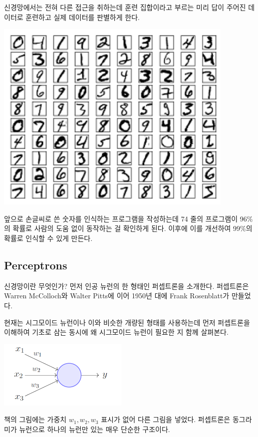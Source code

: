 \documentclass[ %
    a4paper,    %
    amsmath,    %
    itemph,     %
]{oblivoir}     %
\begin{document}
신경망에서는 전혀 다른 접근을 취하는데 훈련 집합이라고 부르는 미리 
답이 주어진 데이터로 훈련하고 실제 데이터를 판별하게 한다. 

\includegraphics[scale=0.5]{image/2_training_set}

앞으로 손글씨로 쓴 숫자를 인식하는 프로그램을 작성하는데 74 줄의 프로그램이 
96\%의 확률로 사람의 도움 없이 동작하는 걸 확인하게 된다. 이후에 
이를 개선하여 99\%의 확률로 인식할 수 있게 만든다. 

\subsection{Perceptrons}

신경망이란 무엇인가? 먼저 인공 뉴런의 한 형태인 퍼셉트론을 소개한다. 
퍼셉트론은 Warren McColloch와 Walter Pitts에 이어 1950년 대에 
Frank Rosenblatt가 만들었다. 

현재는 시그모이드 뉴런이나 이와 비슷한 개량된 형태를 사용하는데 
먼저 퍼셉트론을 이해하여 기초로 삼는 동시에 왜 시그모이드 뉴런이 
필요한 지 함께 살펴본다. 

\begin{center}
\includegraphics{image/3_perceptron}
\end{center}

책의 그림에는 가중치 $w_1, w_2, w_3$ 표시가 없어 다른 그림을 넣었다. 
퍼셉트론은 동그라미가 뉴런으로 하나의 뉴런만 있는 매우 단순한 구조이다. 
\end{document}
